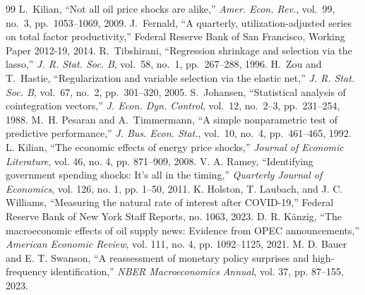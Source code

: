 \documentclass[conference]{IEEEtran}
\begin{document}
\begin{thebibliography}{99}
 L.~Kilian, ``Not all oil price shocks are alike,'' \emph{Amer. Econ. Rev.}, vol.~99, no.~3, pp.~1053--1069, 2009.
 J.~Fernald, ``A quarterly, utilization-adjusted series on total factor productivity,'' Federal Reserve Bank of San Francisco, Working Paper 2012-19, 2014.
 R.~Tibshirani, ``Regression shrinkage and selection via the lasso,'' \emph{J. R. Stat. Soc. B}, vol.~58, no.~1, pp.~267--288, 1996.
 H.~Zou and T.~Hastie, ``Regularization and variable selection via the elastic net,'' \emph{J. R. Stat. Soc. B}, vol.~67, no.~2, pp.~301--320, 2005.
 S.~Johansen, ``Statistical analysis of cointegration vectors,'' \emph{J. Econ. Dyn. Control}, vol.~12, no.~2--3, pp.~231--254, 1988.
 M.~H. Pesaran and A.~Timmermann, ``A simple nonparametric test of predictive performance,'' \emph{J. Bus. Econ. Stat.}, vol.~10, no.~4, pp.~461--465, 1992.
 L. Kilian, ``The economic effects of energy price shocks,'' \emph{Journal of Economic Literature}, vol. 46, no. 4, pp. 871--909, 2008.
 V. A. Ramey, ``Identifying government spending shocks: It's all in the timing,'' \emph{Quarterly Journal of Economics}, vol. 126, no. 1, pp. 1--50, 2011.
 K. Holston, T. Laubach, and J. C. Williams, ``Measuring the natural rate of interest after COVID-19,'' Federal Reserve Bank of New York Staff Reports, no. 1063, 2023.
 D. R. K\"anzig, ``The macroeconomic effects of oil supply news: Evidence from OPEC announcements,'' \emph{American Economic Review}, vol. 111, no. 4, pp. 1092--1125, 2021.
 M. D. Bauer and E. T. Swanson, ``A reassessment of monetary policy surprises and high-frequency identification,'' \emph{NBER Macroeconomics Annual}, vol. 37, pp. 87--155, 2023.
\end{thebibliography}
\end{document}
